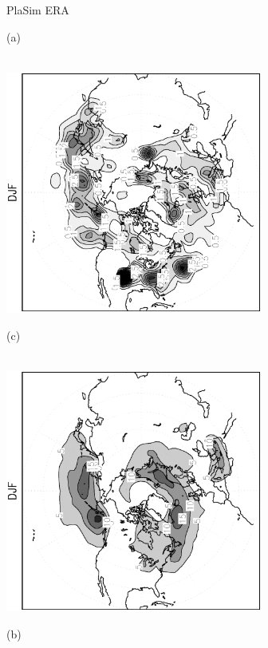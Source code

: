 \documentclass[12pt,a4paper,twoside,openright,headinclude,liststotoc,bibtotoc]{scrreprt}
\begin{document}
\begin{appendix}
\begin{figure}[c]
\hspace{3.8cm}PlaSim \vspace{0.2cm} \hspace{7.3cm} ERA \\
\parbox{8.5cm}{\hspace{0.95cm}\begin{scriptsize}(a)\end{scriptsize} \vspace{-0.5cm} \\
\includegraphics[height=8.0cm,angle=-90]
{eps/cyclgen_PLASIM_T21_45DJF.eps}
}
\parbox{8.5cm}{\hspace{0.95cm}\begin{scriptsize}(c)\end{scriptsize} \vspace{-0.5cm} \\
\includegraphics[height=8.0cm,angle=-90]
{eps/cycldensity_ERA40_T21_45DJF.eps}
}
\parbox{8.5cm}{\hspace{0.95cm}\begin{scriptsize}(b)\end{scriptsize} \vspace{-0.5cm} \\
}
\end{figure}
\end{appendix}
\end{document}
